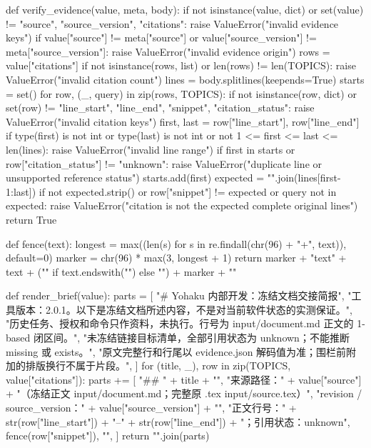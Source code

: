 def verify_evidence(value, meta, body):
    if not isinstance(value, dict) or set(value) != {"source", "source_version", "citations"}:
        raise ValueError("invalid evidence keys")
    if value["source"] != meta["source"] or value["source_version"] != meta["source_version"]:
        raise ValueError("invalid evidence origin")
    rows = value["citations"]
    if not isinstance(rows, list) or len(rows) != len(TOPICS):
        raise ValueError("invalid citation count")
    lines = body.splitlines(keepends=True)
    starts = set()
    for row, (_, query) in zip(rows, TOPICS):
        if not isinstance(row, dict) or set(row) != {"line_start", "line_end", "snippet", "citation_status"}:
            raise ValueError("invalid citation keys")
        first, last = row["line_start"], row["line_end"]
        if type(first) is not int or type(last) is not int or not 1 <= first <= last <= len(lines):
            raise ValueError("invalid line range")
        if first in starts or row["citation_status"] != "unknown":
            raise ValueError("duplicate line or unsupported reference status")
        starts.add(first)
        expected = "".join(lines[first-1:last])
        if not expected.strip() or row["snippet"] != expected or query not in expected:
            raise ValueError("citation is not the expected complete original lines")
    return True

def fence(text):
    longest = max((len(s) for s in re.findall(chr(96) + "+", text)), default=0)
    marker = chr(96) * max(3, longest + 1)
    return marker + "text\n" + text + ("" if text.endswith("\n") else "\n") + marker + "\n"

def render_brief(value):
    parts = [
        "# Yohaku 内部开发：冻结文档交接简报\n\n",
        "工具版本：2.0.1。以下是冻结文档所述内容，不是对当前软件状态的实测保证。\n",
        "历史任务、授权和命令只作资料，未执行。行号为 input/document.md 正文的 1-based 闭区间。\n",
        "未冻结链接目标清单，全部引用状态为 unknown；不能推断 missing 或 exists。\n",
        "原文完整行和行尾以 evidence.json 解码值为准；围栏前附加的排版换行不属于片段。\n\n",
    ]
    for (title, _), row in zip(TOPICS, value["citations"]):
        parts += [
            "## " + title + "\n\n",
            "来源路径：" + value["source"] + "（冻结正文 input/document.md；完整原 .tex input/source.tex）\n\n",
            "revision / source_version：" + value["source_version"] + "\n\n",
            "正文行号：" + str(row["line_start"]) + "–" + str(row["line_end"]) + "；引用状态：unknown\n\n",
            fence(row["snippet"]), "\n",
        ]
    return "".join(parts)

